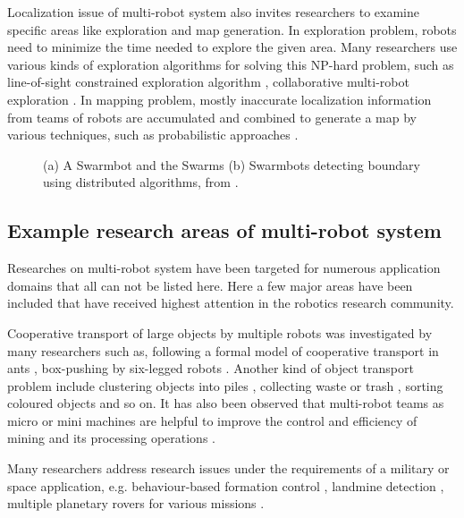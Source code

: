 Localization issue of multi-robot system also invites researchers to examine specific areas like exploration and map generation. In exploration problem, robots need to minimize the time needed to explore the given area. Many researchers use various kinds of exploration algorithms for solving this NP-hard problem, such as line-of-sight constrained exploration algorithm , collaborative multi-robot exploration \cite{Burgard+2000}. In mapping problem, mostly inaccurate localization information from teams of robots are accumulated and combined to generate a map by various techniques, such as probabilistic approaches \cite{Thurn+2000}.
\begin{figure}
\centering
{} 
\hspace{0.25cm}
\caption{ (a) A Swarmbot and the Swarms 
 (b) Swarmbots detecting boundary using distributed algorithms, from \protect{}.}
\label{fig:swarmbot-boundary-detection}
\end{figure}
\subsection*{Example research areas of multi-robot system}
\label{bg:mrs:eg}
Researches on multi-robot system have been targeted for numerous application domains that all can not be listed here. Here  a few major areas have been included that have received highest attention in the robotics research community. 

Cooperative transport of large objects  by multiple robots was investigated by many researchers such as, following a formal model of cooperative transport in ants \cite{Kube+1993}, box-pushing by six-legged robots \cite{Mataric+1995}. Another kind of object transport problem include clustering objects into piles  \cite{Beckers+1994}, collecting waste or trash \cite{Parker1994}, sorting coloured objects  \cite{Melhuish+1998} and so on. It has also been observed that multi-robot teams as micro or mini machines are helpful to improve the control and efficiency of mining and its processing operations \cite{Dunbar+2002}. 

Many researchers address research issues under the requirements of a military or space application, e.g. behaviour-based formation control \cite{Balch+1998}, landmine detection \cite{Franklin+1995}, multiple planetary rovers for various missions \cite{Huntsberger2004}.

